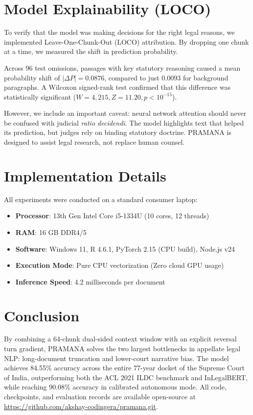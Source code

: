 \documentclass[11pt,a4paper]{article}
\begin{document}
\section{Model Explainability (LOCO)}
To verify that the model was making decisions for the right legal reasons, we implemented Leave-One-Chunk-Out (LOCO) attribution. By dropping one chunk at a time, we measured the shift in prediction probability.

Across 96 test omissions, passages with key statutory reasoning caused a mean probability shift of $|\Delta P| = 0.0876$, compared to just $0.0093$ for background paragraphs. A Wilcoxon signed-rank test confirmed that this difference was statistically significant ($W = 4,215, Z = 11.20, p < 10^{-15}$). 

However, we include an important caveat: neural network attention should never be confused with judicial \textit{ratio decidendi}. The model highlights text that helped its prediction, but judges rely on binding statutory doctrine. PRAMANA is designed to assist legal research, not replace human counsel.

\section{Implementation Details}
All experiments were conducted on a standard consumer laptop:
\begin{itemize}
    \item \textbf{Processor}: 13th Gen Intel Core i5-1334U (10 cores, 12 threads)
    \item \textbf{RAM}: 16 GB DDR4/5
    \item \textbf{Software}: Windows 11, R 4.6.1, PyTorch 2.15 (CPU build), Node.js v24
    \item \textbf{Execution Mode}: Pure CPU vectorization (Zero cloud GPU usage)
    \item \textbf{Inference Speed}: 4.2 milliseconds per document
\end{itemize}

\section{Conclusion}
By combining a 64-chunk dual-sided context window with an explicit reversal turn gradient, PRAMANA solves the two largest bottlenecks in appellate legal NLP: long-document truncation and lower-court narrative bias. The model achieves 84.55\% accuracy across the entire 77-year docket of the Supreme Court of India, outperforming both the ACL 2021 ILDC benchmark and InLegalBERT, while reaching 90.08\% accuracy in calibrated autonomous mode. All code, checkpoints, and evaluation records are available open-source at \url{https://github.com/akshay-codingera/pramana.git}.
\end{document}
